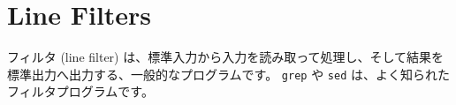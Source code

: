\section{Line Filters}

フィルタ (line filter) は、標準入力から入力を読み取って処理し、そして結果を標準出力へ出力する、一般的なプログラムです。 \texttt{grep} や \texttt{sed} は、よく知られたフィルタプログラムです。




